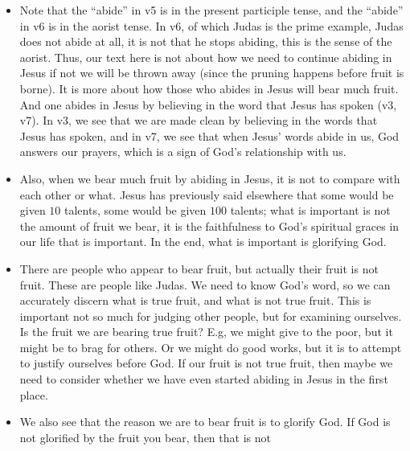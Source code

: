 \begin{itemize}
{  before any fruit is produced. This is a little different from the vineyard
  analogy in the OT, where the pruning happens after God has judged that
  Israel has bore no fruit. }
  \item{Note that the ``abide'' in v5 is in the present participle tense, and
  the ``abide'' in v6 is in the aorist tense. In v6, of which Judas is the
  prime example, Judas does not abide at all, it is not that he stops
  abiding, this is the sense of the aorist. Thus, our text here is not about
  how we need to continue abiding in Jesus if not we will be thrown away
  (since the pruning happens before fruit is borne). It is more about how
  those who abides in Jesus will bear much fruit. And one abides in Jesus by
  believing in the word that Jesus has spoken (v3, v7). In v3, we see that we
  are made clean by believing in the words that Jesus has spoken, and in v7,
  we see that when Jesus' words abide in us, God answers our prayers, which
  is a sign of God's relationship with us.}
  \item{Also, when we bear much fruit by abiding in Jesus, it is not to
  compare with each other or what. Jesus has previously said elsewhere that
  some would be given $10$ talents, some would be given $100$ talents; what
  is important is not the amount of fruit we bear, it is the faithfulness to
  God's spiritual graces in our life that is important. In the end, what is
  important is glorifying God.  }
  \item{There are people who appear to bear fruit, but actually their fruit
  is not fruit. These are people like Judas. We need to know God's word, so
  we can accurately discern what is true fruit, and what is not true fruit.
  This is important not so much for judging other people, but for examining
  ourselves. Is the fruit we are bearing true fruit? E.g, we might give to
  the poor, but it might be to brag for others. Or we might do good works,
  but it is to attempt to justify ourselves before God. If our fruit is not
  true fruit, then maybe we need to consider whether we have even started
  abiding in Jesus in the first place.}
  \item{We also see that the reason we are to bear fruit is to glorify God.
  If God is not glorified by the fruit you bear, then that is not
}
\end{itemize}
